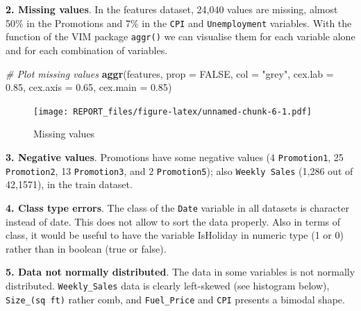 \documentclass[11pt,]{article}
\newenvironment{Shaded}{\begin{snugshade}}{\end{snugshade}}
\newcommand{\KeywordTok}[1]{\textcolor[rgb]{0.13,0.29,0.53}{\textbf{{#1}}}}
\newcommand{\DataTypeTok}[1]{\textcolor[rgb]{0.13,0.29,0.53}{{#1}}}
\newcommand{\FloatTok}[1]{\textcolor[rgb]{0.00,0.00,0.81}{{#1}}}
\newcommand{\StringTok}[1]{\textcolor[rgb]{0.31,0.60,0.02}{{#1}}}
\newcommand{\CommentTok}[1]{\textcolor[rgb]{0.56,0.35,0.01}{\textit{{#1}}}}
\newcommand{\OtherTok}[1]{\textcolor[rgb]{0.56,0.35,0.01}{{#1}}}
\newcommand{\NormalTok}[1]{{#1}}
\begin{document}
\textbf{2. Missing values}. In the features dataset, 24,040 values are
missing, almost 50\% in the Promotions and 7\% in the \texttt{CPI} and
\texttt{Unemployment} variables. With the function of the VIM package
\texttt{aggr()} we can visualise them for each variable alone and for
each combination of variables.

\begin{Shaded}
\begin{Highlighting}[]
\CommentTok{# Plot missing values}
\KeywordTok{aggr}\NormalTok{(features, }\DataTypeTok{prop =} \OtherTok{FALSE}\NormalTok{, }\DataTypeTok{col =} \StringTok{"grey"}\NormalTok{, }\DataTypeTok{cex.lab =} \FloatTok{0.85}\NormalTok{, }\DataTypeTok{cex.axis =} \FloatTok{0.65}\NormalTok{, }
    \DataTypeTok{cex.main =} \FloatTok{0.85}\NormalTok{)}
\end{Highlighting}
\end{Shaded}

\begin{figure}[htbp]
\centering
\texttt{[image: REPORT\_files/figure-latex/unnamed-chunk-6-1.pdf]}
\caption{Missing values}
\end{figure}

\textbf{3. Negative values}. Promotions have some negative values (4
\texttt{Promotion1}, 25 \texttt{Promotion2}, 13 \texttt{Promotion3}, and
2 \texttt{Promotion5}); also \texttt{Weekly\ Sales} (1,286 out of
42,1571), in the train dataset.

\textbf{4. Class type errors}. The class of the \texttt{Date} variable
in all datasets is character instead of date. This does not allow to
sort the data properly. Also in terms of class, it would be useful to
have the variable IsHoliday in numeric type (1 or 0) rather than in
boolean (true or false).

\textbf{5. Data not normally distributed}. The data in some variables is
not normally distributed. \texttt{Weekly\_Sales} data is clearly
left-skewed (see histogram below), \texttt{Size\_(sq\ ft)} rather comb,
and \texttt{Fuel\_Price} and \texttt{CPI} presents a bimodal shape.

\begin{Shaded}
\end{Shaded}
\end{document}
